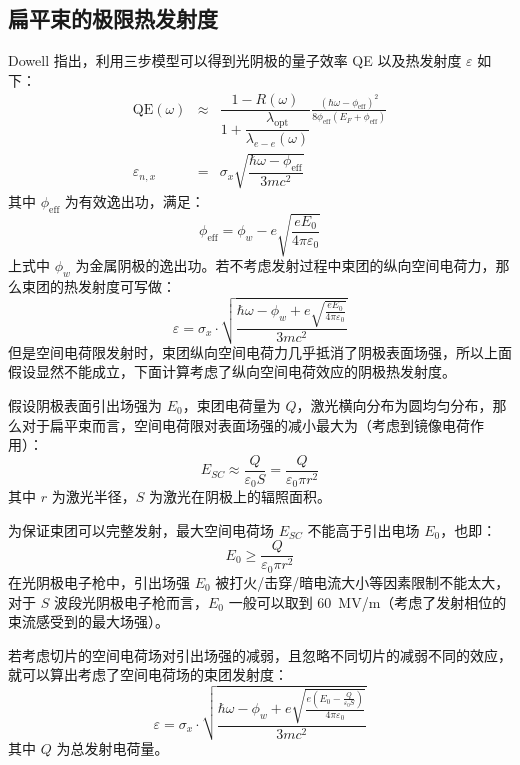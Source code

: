 \subsection{扁平束的极限热发射度}
Dowell 指出，利用三步模型可以得到光阴极的量子效率 QE 以及热发射度 $\varepsilon$ 如下：
\begin{eqnarray*}
\text{QE}(\omega) &\approx& \dfrac{1-R(\omega)}{1+\dfrac{\lambda_{\text{opt}}}{\lambda_{e-e}(\omega)}}\frac{(\hbar\omega-\phi_{\text{eff}})^2}{8\phi_{\text{eff}}(E_F+\phi_{\text{eff}})}\\
\varepsilon_{n,x} &=& \sigma_x\sqrt{\dfrac{\hbar\omega-\phi_{\text{eff}}}{3mc^2}}
\end{eqnarray*}
其中 $\phi_{\text{eff}}$ 为有效逸出功，满足：
\[
\phi_{\text{eff}} = \phi_{w} - e\sqrt{\frac{eE_0}{4\pi\varepsilon_0}}
\]
上式中 $\phi_{w}$ 为金属阴极的逸出功。若不考虑发射过程中束团的纵向空间电荷力，那么束团的热发射度可写做：
\begin{equation}
\varepsilon = \sigma_x\cdot\sqrt{\frac{\hbar\omega-\phi_w+e\sqrt{\frac{eE_0}{4\pi\varepsilon_0}}}{3mc^2}}
\label{eq:tot-emit-none}
\end{equation}
但是空间电荷限发射时，束团纵向空间电荷力几乎抵消了阴极表面场强，所以上面假设显然不能成立，下面计算考虑了纵向空间电荷效应的阴极热发射度。

假设阴极表面引出场强为 $E_0$，束团电荷量为 $Q$，激光横向分布为圆均匀分布，那么对于扁平束而言，空间电荷限对表面场强的减小最大为（考虑到镜像电荷作用）：
\begin{equation}
E_{SC} \approx \frac{Q}{\varepsilon_0S} = \frac{Q}{\varepsilon_0\pi r^2}
\label{eq:e-sc-pancake}
\end{equation}
其中 $r$ 为激光半径，$S$ 为激光在阴极上的辐照面积。

为保证束团可以完整发射，最大空间电荷场 $E_{SC}$ 不能高于引出电场 $E_0$，也即：
\begin{equation}
E_0 \ge \frac{Q}{\varepsilon_0\pi r^2}
\label{eq:sc-limit}
\end{equation}
在光阴极电子枪中，引出场强 $E_0$ 被打火/击穿/暗电流大小等因素限制不能太大，对于 $S$ 波段光阴极电子枪而言，$E_0$ 一般可以取到 \SI{60}{MV/m}（考虑了发射相位的束流感受到的最大场强）。

若考虑切片的空间电荷场对引出场强的减弱，且忽略不同切片的减弱不同的效应，就可以算出考虑了空间电荷场的束团发射度：
\begin{equation}
\varepsilon = \sigma_x\cdot\sqrt{\frac{\hbar\omega-\phi_w+e\sqrt{\frac{e\left(E_0-\frac{Q}{\varepsilon_0 S}\right)}{4\pi\varepsilon_0}}}{3mc^2}}
\label{eq:tot-emit-orig}
\end{equation}
其中 $Q$ 为总发射电荷量。

